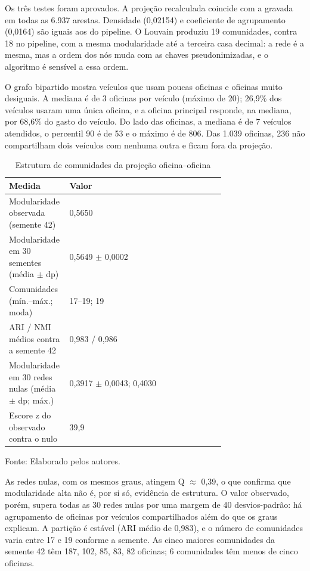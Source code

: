 \documentclass[12pt,a4paper]{article}
\begin{document}
Os três testes foram aprovados. A projeção recalculada coincide com a gravada em todas as 6.937 arestas. Densidade (0,02154) e coeficiente de agrupamento (0,0164) são iguais aos do pipeline. O Louvain produziu 19 comunidades, contra 18 no pipeline, com a mesma modularidade até a terceira casa decimal: a rede é a mesma, mas a ordem dos nós muda com as chaves pseudonimizadas, e o algoritmo é sensível a essa ordem.

O grafo bipartido mostra veículos que usam poucas oficinas e oficinas muito desiguais. A mediana é de 3 oficinas por veículo (máximo de 20); 26,9\% dos veículos usaram uma única oficina, e a oficina principal responde, na mediana, por 68,6\% do gasto do veículo. Do lado das oficinas, a mediana é de 7 veículos atendidos, o percentil 90 é de 53 e o máximo é de 806. Das 1.039 oficinas, 236 não compartilham dois veículos com nenhuma outra e ficam fora da projeção.

\begin{table}[ht]
\centering\small
\caption{Estrutura de comunidades da projeção oficina–oficina}
\label{tab:t2}
\begin{tabular}{lp{0.72\linewidth}}
\hline
\textbf{Medida} & \textbf{Valor} \\ \hline
Modularidade observada (semente 42) & 0,5650 \\
Modularidade em 30 sementes (média $\pm$ dp) & 0,5649 $\pm$ 0,0002 \\
Comunidades (mín.–máx.; moda) & 17–19; 19 \\
ARI / NMI médios contra a semente 42 & 0,983 / 0,986 \\
Modularidade em 30 redes nulas (média $\pm$ dp; máx.) & 0,3917 $\pm$ 0,0043; 0,4030 \\
Escore z do observado contra o nulo & 39,9 \\
\hline
\end{tabular}
\par\smallskip\footnotesize Fonte: Elaborado pelos autores.
\end{table}

As redes nulas, com os mesmos graus, atingem Q $\approx$ 0,39, o que confirma que modularidade alta não é, por si só, evidência de estrutura. O valor observado, porém, supera todas as 30 redes nulas por uma margem de 40 desvios-padrão: há agrupamento de oficinas por veículos compartilhados além do que os graus explicam. A partição é estável (ARI médio de 0,983), e o número de comunidades varia entre 17 e 19 conforme a semente. As cinco maiores comunidades da semente 42 têm 187, 102, 85, 83, 82 oficinas; 6 comunidades têm menos de cinco oficinas.
\end{document}
